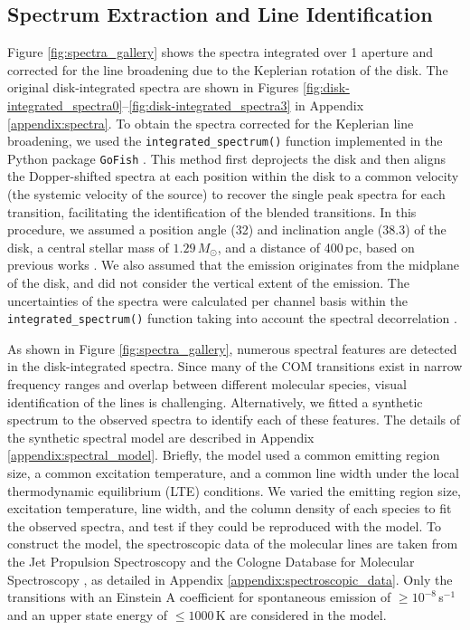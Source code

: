 \documentclass[linenumbers, twocolumn, twocolappendix, astrosymb, times]{aastex631}
\begin{document}
\subsection{Spectrum Extraction and Line Identification}\label{subsec:line_identification}
Figure \ref{fig:spectra_gallery} shows the spectra integrated over 1 aperture and corrected for the line broadening due to the Keplerian rotation of the disk. The original disk-integrated spectra are shown in Figures \ref{fig:disk-integrated_spectra0}--\ref{fig:disk-integrated_spectra3} in Appendix \ref{appendix:spectra}. To obtain the spectra corrected for the Keplerian line broadening, we used the \texttt{integrated\_spectrum()} function implemented in the Python package \texttt{GoFish} \citep{GoFish}. This method first deprojects the disk and then aligns the Dopper-shifted spectra at each position within the disk to a common velocity (the systemic velocity of the source) to recover the single peak spectra for each transition, facilitating the identification of the blended transitions. In this procedure, we assumed a position angle (32\arcdeg) and inclination angle (38.3\arcdeg) of the disk, a central stellar mass of $1.29\,M_\odot$, and a distance of 400\,pc, based on previous works \citep{Cieza2016, Tobin2023}. We also assumed that the emission originates from the midplane of the disk, and did not consider the vertical extent of the emission. The uncertainties of the spectra were calculated per channel basis within the \texttt{integrated\_spectrum()} function taking into account the spectral decorrelation \citep{Yen2016}.

As shown in Figure \ref{fig:spectra_gallery}, numerous spectral features are detected in the disk-integrated spectra. Since many of the COM transitions exist in narrow frequency ranges and overlap between different molecular species, visual identification of the lines is challenging. Alternatively, we fitted a synthetic spectrum to the observed spectra to identify each of these features. The details of the synthetic spectral model are described in Appendix \ref{appendix:spectral_model}. Briefly, the model used a common emitting region size, a common excitation temperature, and a common line width under the local thermodynamic equilibrium (LTE) conditions. We varied the emitting region size, excitation temperature, line width, and the column density of each species to fit the observed spectra, and test if they could be reproduced with the model. To construct the model, the spectroscopic data of the molecular lines are taken from the Jet Propulsion Spectroscopy \citep[JPL;][]{JPL} and the Cologne Database for Molecular Spectroscopy \citep[CDMS;][]{CDMS1, CDMS2, CDMS3}, as detailed in Appendix \ref{appendix:spectroscopic_data}. Only the transitions with an Einstein A coefficient for spontaneous emission of $\geq10^{-8}$\,s$^{-1}$ and an upper state energy of $\leq1000$\,K are considered in the model.
\end{document}
